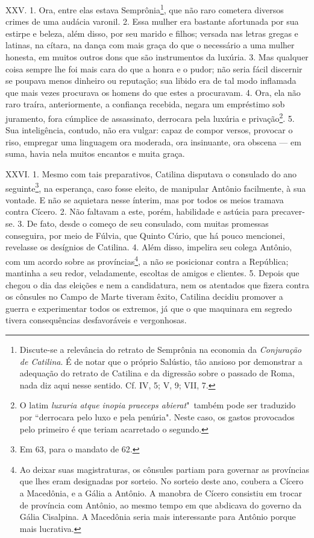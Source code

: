 XXV. 1. Ora, entre elas estava Semprônia\footnote{Discute-se a relevância do
retrato de Semprônia na economia da \emph{Conjuração de Catilina}. É de notar
que o próprio Salústio, tão ansioso por demonstrar a adequação do retrato de
Catilina e da digressão sobre o passado de Roma, nada diz aqui nesse sentido.
Cf. IV, 5; V, 9; VII, 7.}, que não raro cometera diversos crimes de uma audácia
varonil. 2. Essa mulher era bastante afortunada por sua estirpe e beleza, além
disso, por seu marido e filhos; versada nas letras gregas e latinas, na cítara,
na dança com mais graça do que o necessário a uma mulher honesta, em muitos
outros dons que são instrumentos da luxúria. 3. Mas qualquer coisa sempre lhe
foi mais cara do que a honra e o pudor; não seria fácil discernir se poupava
menos dinheiro ou reputação; sua libido era de tal modo inflamada que mais
vezes procurava os homens do que estes a procuravam. 4. Ora, ela não raro
traíra, anteriormente, a confiança recebida, negara um empréstimo sob
juramento, fora cúmplice de assassinato, derrocara pela luxúria e privação\footnote{O latim \emph{luxuria atque inopia praeceps abierat}"\ também pode ser traduzido por ``derrocara pelo luxo e pela penúria". Neste caso, os gastos provocados pelo primeiro é que teriam acarretado o segundo.}. 5. 
Sua inteligência, contudo, não era vulgar: capaz de compor versos, provocar o
riso, empregar uma linguagem ora moderada, ora insinuante, ora obscena --- em
suma, havia nela muitos encantos e muita graça.

XXVI. 1. Mesmo com tais preparativos, Catilina disputava o consulado do ano
seguinte\footnote{Em 63, para o mandato de 62.}, na esperança, caso fosse
eleito, de manipular Antônio facilmente, à sua vontade. E não se aquietara
nesse ínterim, mas por todos os meios tramava contra Cícero. 2. Não faltavam a
este, porém, habilidade e astúcia para precaver-se. 3. De fato, desde o começo
de seu consulado, com muitas promessas conseguira, por meio de Fúlvia, que
Quinto Cúrio, que há pouco mencionei, revelasse os desígnios de Catilina. 4.
Além disso, impelira seu colega Antônio, com um acordo sobre as
províncias\footnote{Ao deixar suas magistraturas, os cônsules partiam para
governar as províncias que lhes eram designadas por sorteio. No sorteio deste
ano, coubera a Cícero a Macedônia, e a Gália a Antônio. A manobra de Cícero
consistiu em trocar de província com Antônio, ao mesmo tempo em que abdicava do
governo da Gália Cisalpina. A Macedônia seria mais interessante para Antônio porque mais
lucrativa.}, a não se posicionar contra a República; mantinha a seu redor,
veladamente, escoltas de amigos e clientes. 5. Depois que chegou o dia das
eleições e nem a candidatura, nem os atentados que fizera contra os cônsules no
Campo de Marte tiveram êxito, Catilina decidiu promover a guerra e experimentar
todos os extremos, já que o que maquinara em segredo tivera consequências
desfavoráveis e vergonhosas.

